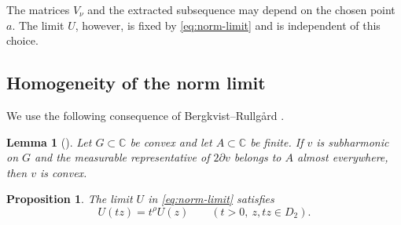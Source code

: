 \documentclass[12pt,letterpaper,reqno]{amsart}
\newtheorem{lem}[thm]{Lemma}
\newtheorem{prop}[thm]{Proposition}
\theoremstyle{definition}
\numberwithin{equation}{section}
\newcommand{\C}{\mathbb C}
\begin{document}
The matrices \(V_\nu\) and the extracted subsequence may depend on the
chosen point \(a\). The limit \(U\), however, is fixed by
\eqref{eq:norm-limit} and is independent of this choice.


\subsection{Homogeneity of the norm limit}

We use the following consequence of
Bergkvist--Rullg{\aa}rd \cite[Corollary~1]{BR02}.

\begin{lem}[\cite{BR02}]\label{lem:finite-gradient-convex}
Let \(G\subset\C\) be convex and let \(A\subset\C\) be finite. If
\(v\) is subharmonic on \(G\) and the measurable representative of
\(2\partial v\) belongs to \(A\) almost everywhere, then \(v\) is
convex.
\end{lem}

\begin{prop}\label{prop:homogeneity}
The limit \(U\) in \eqref{eq:norm-limit} satisfies
\begin{equation}\label{eq:homogeneity}
 U(tz)=t^\rho U(z)
 \qquad
 (t>0,\ z,tz\in D_2).
\end{equation}
\end{prop}
\end{document}
